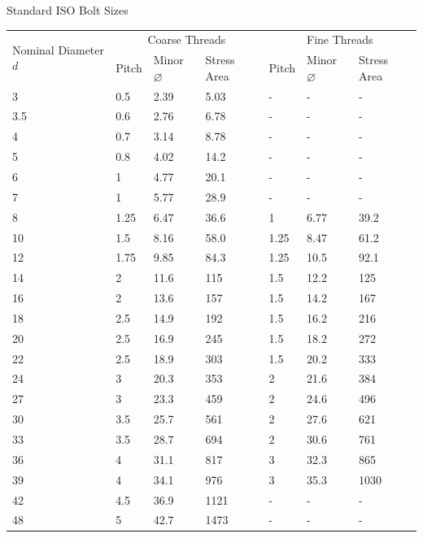 \documentclass[10pt, svgnames]{beamer}
\begin{document}
\begin{frame}[label={sec:org9862867}]{Standard ISO Bolt Sizes}
\scriptsize
\begin{tabular}{ p{1.2cm} p{1cm} p{1cm} p{1.3cm} p{1cm} p{1cm} p{1.3cm}}
  \toprule
  \multirow{2}{1.5cm}{Nominal Diameter $d$} & \multicolumn{3}{c}{Coarse Threads} & \multicolumn{3}{c}{Fine Threads} \\ \cmidrule{2-7}
                                            & Pitch & Minor $\diameter$ & Stress Area & Pitch & Minor $\diameter$ & Stress Area \\
  \midrule
  3   & 0.5  & 2.39 & 5.03 & -    & -    & - \\
  3.5 & 0.6  & 2.76 & 6.78 & -    & -    & - \\
  4   & 0.7  & 3.14 & 8.78 & -    & -    & - \\
  5   & 0.8  & 4.02 & 14.2 & -    & -    & - \\
  6   & 1    & 4.77 & 20.1 & -    & -    & - \\
  7   & 1    & 5.77 & 28.9 & -    & -    & - \\
  8   & 1.25 & 6.47 & 36.6 & 1    & 6.77 & 39.2 \\
  10  & 1.5  & 8.16 & 58.0 & 1.25 & 8.47 & 61.2 \\
  12  & 1.75 & 9.85 & 84.3 & 1.25 & 10.5 & 92.1 \\
  14  & 2    & 11.6 & 115  & 1.5  & 12.2 & 125 \\
  16  & 2    & 13.6 & 157  & 1.5  & 14.2 & 167 \\
  18  & 2.5  & 14.9 & 192  & 1.5  & 16.2 & 216 \\
  20  & 2.5  & 16.9 & 245  & 1.5  & 18.2 & 272 \\
  22  & 2.5  & 18.9 & 303  & 1.5  & 20.2 & 333 \\
  24  & 3    & 20.3 & 353  & 2    & 21.6 & 384 \\
  27  & 3    & 23.3 & 459  & 2    & 24.6 & 496 \\
  30  & 3.5  & 25.7 & 561  & 2    & 27.6 & 621 \\
  33  & 3.5  & 28.7 & 694  & 2    & 30.6 & 761 \\
  36  & 4    & 31.1 & 817  & 3    & 32.3 & 865 \\
  39  & 4    & 34.1 & 976  & 3    & 35.3 & 1030 \\
  42  & 4.5  & 36.9 & 1121 & -    & -    & - \\
  48  & 5    & 42.7 & 1473 & -    & -    & - \\
  \bottomrule
\end{tabular}
\end{frame}
\end{document}
